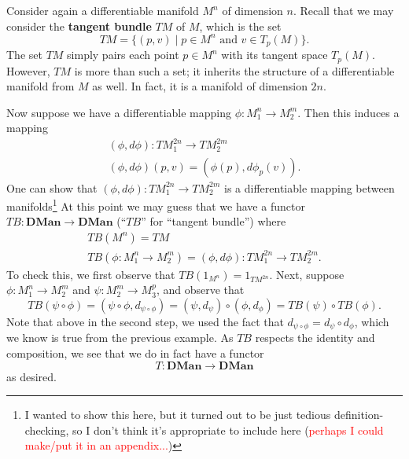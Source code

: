     \begin{example}
        Consider again a differentiable manifold $M^n$ of dimension $n$. Recall that 
        we may consider the \textbf{tangent bundle} $TM$ of $M$, which is the set 
        \[
            TM = \{(p, v) \mid p \in M^n \text{ and } v \in T_p(M)\}.
        \]
        The set $TM$ simply pairs each point $p \in M^n$ with its tangent space $T_p(M)$. 
        However, $TM$ is more than such a set; it inherits the structure of a differentiable manifold 
        from $M$ as well. In fact, it is a manifold of dimension $2n$. 

        Now suppose we have a differentiable mapping $\phi: M_1^n \to M_2^m$. Then 
        this induces a mapping 
        \begin{gather*}
            (\phi, d\phi): TM_1^{2n} \to TM_2^{2m}\\
            (\phi, d\phi)(p, v) = (\phi(p), d\phi_p(v)).
        \end{gather*}
        One can show that $(\phi, d\phi): TM_1^{2n} \to TM_2^{2m}$ is a differentiable mapping 
        between manifolds\footnote{I wanted to show this here, 
        but it turned out to be just tedious definition-checking, so I don't think it's appropriate 
        to include here (\textcolor{Red}{perhaps I could make/put it in an appendix...})} 
        At this point we may guess that we have a functor 
        $TB: \textbf{DMan} \to \textbf{DMan}$ (``$TB$'' for ``tangent  bundle'') 
        where 
        \begin{gather*}
            TB(M^n) = TM\\
            TB(\phi: M_1^n \to M_2^m) = (\phi, d\phi): TM_1^{2n} \to TM_2^{2m}.
        \end{gather*}        
        To check this, we first observe that $TB(1_{M^n}) = 1_{TM^{2n}}$.
        Next, suppose $\phi: M_1^n \to M_2^m$ and $\psi: M_2^m \to M_3^p$, 
        and observe that 
        \[
            TB(\psi \circ \phi)
            = 
            (\psi \circ \phi, d_{\psi \circ \phi})
            =
            (\psi, d_{\psi}) \circ (\phi, d_{\phi})
            =
            TB(\psi) \circ TB(\phi).
        \]
        Note that above in the second step, we used the fact that 
        $d_{\psi \circ \phi} = d_{\psi} \circ d_{\phi}$, which we know is true from 
        the previous example. As $TB$ respects the identity and composition, we see that we 
        do in fact have a functor 
        \[
            T: \textbf{DMan} \to \textbf{DMan}  
        \]
        as desired.
    \end{example}

